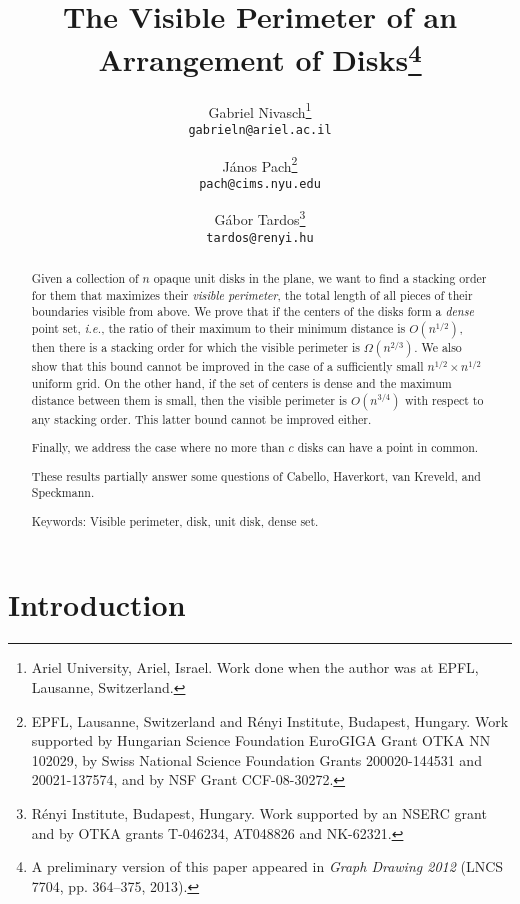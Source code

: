 \documentclass[11pt]{article}
\begin{document}
\title{The Visible Perimeter of an Arrangement of Disks\footnote{A preliminary version of this paper appeared in \emph{Graph Drawing 2012} (LNCS 7704, pp. 364--375, 2013).}}

\author{Gabriel Nivasch\footnote{Ariel University, Ariel, Israel. Work done when the author was at EPFL, Lausanne, Switzerland.}\\\texttt{gabrieln@ariel.ac.il} \and J\'anos Pach\footnote{EPFL, Lausanne, Switzerland and R\'enyi Institute, Budapest, Hungary. Work supported by Hungarian Science Foundation EuroGIGA Grant OTKA NN 102029, by Swiss National Science Foundation Grants 200020-144531 and 20021-137574, and by NSF Grant CCF-08-30272.}\\\texttt{pach@cims.nyu.edu}  \and G\'abor Tardos\footnote{R\'enyi Institute, Budapest, Hungary. Work supported by an NSERC grant and by OTKA grants T-046234, AT048826 and NK-62321.}\\\texttt{tardos@renyi.hu}}

\maketitle


\begin{abstract}
Given a collection of $n$ opaque unit disks in the plane, we want to find a stacking order for them that maximizes their {\em visible perimeter}, the total length of
all pieces of their boundaries visible from above.  We prove that if the centers of the disks form a {\em dense} point set,
{\em i.e.}, the ratio of their maximum to their minimum distance
is $O(n^{1/2})$, then there is a stacking order for which the visible
perimeter is $\Omega(n^{2/3})$. We also show that
this bound cannot be improved in the case of a sufficiently small $n^{1/2}\times n^{1/2}$ uniform grid. On the other hand, if the
set of centers is dense and the maximum distance between them is
small, then the visible perimeter is $O(n^{3/4})$ with respect to any stacking order. This latter bound cannot be improved either.

Finally, we address the case where no more than $c$ disks can have a point in common.

These results partially answer some questions of Cabello, Haverkort, van Kreveld, and Speckmann.

Keywords: Visible perimeter, disk, unit disk, dense set.
\end{abstract}


\section{Introduction}
\end{document}
